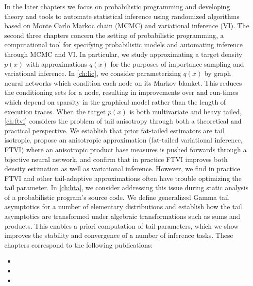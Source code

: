 \documentclass[thesis.tex]{subfiles}
\begin{document}
In the later chapters we focus on probabilistic programming and developing theory and tools
to automate statistical inference using randomized algorithms based on
Monte Carlo Markoc chain (MCMC) and variational inference (VI).
The second three chapters concern the setting of probabilistic programming, a computational tool
for specifying probabilistic models and automating inference through MCMC and VI. In particular, we
study approximating a target density $p(x)$ with approximations $q(x)$ for the purposes of
importance sampling and variational inference.
In \cref{ch:lic}, we consider parameterizing $q(x)$ by graph neural networks which condition each
node on its Markov blanket. This reduces the conditioning sets for a node, resulting in improvements over
\cite{le2017inference} and run-times which depend on sparsity in the graphical model rather than
the length of execution traces.
When the target $p(x)$ is both multivariate and heavy tailed, \cref{ch:ftvi}
considers the problem of tail anisotropy through both a theoretical and practical perspective.
We establish that prior fat-tailed estimators \citep{jaini2020tails} are tail isotropic, propose
an anisotropic approximation (fat-tailed variational inference, FTVI) where
an anisotropic product base measures is pushed forwards through a bijective neural network,
and confirm that in practice FTVI improves both density estimation as well as variational inference.
However, we find in practice FTVI and other tail-adaptive approximations often have trouble optimizing
the tail parameter. In \cref{ch:hta}, we consider addressing this issue during static analysis of a
probabilistic program's source code. We define generalized Gamma tail asymptotics for a number of
elementary distributions and establish how the tail asymptotics are transformed under algebraic transformations
such as sums and products. This enables a priori computation of tail parameters, which we show
improves the stability and convergence of a number of inference tasks.
These chapters correspond to the following publications:
\begin{itemize}
    \item {}
    \item {}
    \item {}
\end{itemize}
\end{document}

